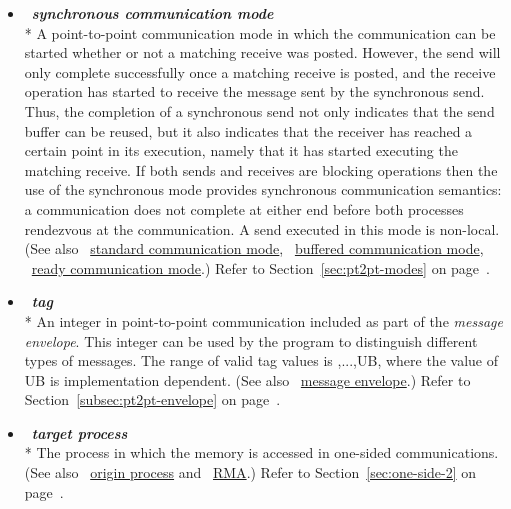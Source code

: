 \begin{itemize}
\label{glossary:synchronous_communication_mode}
\item  ~\hypertarget{glossary:synchronous_communication_mode}{\emph{\textbf{synchronous communication mode}}} \\*
A point-to-point communication mode in which the
communication can be started whether or
not a matching receive was posted.  However, the send will only complete 
successfully once a matching receive is posted, and the
receive operation has started to receive the message sent by the
synchronous send.
Thus, the completion of a synchronous send not only indicates that the
send buffer can be reused, but 
it also indicates that the receiver has
reached a certain point in its execution, namely that it has started
executing the matching receive.  If both sends and receives are
blocking operations then the use of the synchronous mode provides
synchronous communication semantics: a communication does not complete
at either end before both processes rendezvous at the
communication.  A send executed in this mode is non-local.
(See also ~\hyperlink{glossary:standard_communication_mode}{standard communication mode}, 
~\hyperlink{glossary:buffered_communication_mode}{buffered communication mode},
~\hyperlink{glossary:ready communication_mode}{ready communication mode}.)
Refer to Section~\ref{sec:pt2pt-modes} on page~\pageref{sec:pt2pt-modes}.

\label{glossary:tag}
\item  ~\hypertarget{glossary:tag}{\emph{\textbf{tag}}} \\*
An integer in point-to-point communication included as part of the \emph{message envelope}.
This integer can be used by the program to distinguish different types of
messages.
The range of valid tag values is {,...,UB}, where the value of {\sf UB} is
implementation dependent.
(See also ~\hyperlink{glossary:message_envelope}{message envelope}.)
Refer to Section~\ref{subsec:pt2pt-envelope} on page~\pageref{subsec:pt2pt-envelope}.

\label{glossary:target_process}
\item  ~\hypertarget{glossary:target_process}{\emph{\textbf{target process}}} \\*
The process in which the memory is accessed in one-sided communications.
(See also ~\hyperlink{glossary:origin_process}{origin process} and 
~\hyperlink{glossary:RMA}{RMA}.)
Refer to Section~\ref{sec:one-side-2} on page~\pageref{sec:one-side-2}.


\end{itemize}
